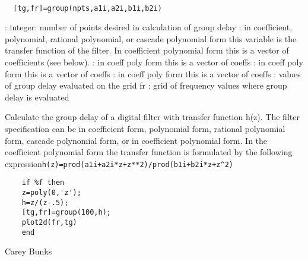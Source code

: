 \begin{mandesc}
   \\ %
\end{mandesc}
\begin{calling_sequence}
\begin{verbatim}
  [tg,fr]=group(npts,a1i,a2i,b1i,b2i)  
\end{verbatim}
\end{calling_sequence}
\begin{parameters}
  \begin{varlist}
    : integer: number of points desired in calculation of group delay
    : in coefficient, polynomial, rational polynomial, or cascade polynomial form this variable is the transfer function of the filter. In coefficient polynomial form this is a vector of coefficients (see below).
    : in coeff poly form this is a vector of coeffs
    : in coeff poly form this is a vector of coeffs
    : in coeff poly form this is a vector of coeffs
    : values of group delay evaluated on the grid fr
    : grid of frequency values where group delay is evaluated
  \end{varlist}
\end{parameters}
\begin{mandescription}
  Calculate the group delay of a digital filter
  with transfer function h(z).
  The filter specification can be in coefficient form,
  polynomial form, rational polynomial form, cascade
  polynomial form, or in coefficient polynomial form.
  In the coefficient polynomial form the transfer function is
  formulated by the following expression\verb!h(z)=prod(a1i+a2i*z+z**2)/prod(b1i+b2i*z+z^2)!
\end{mandescription}
\begin{examples}
  \begin{Verbatim}
    if %f then
    z=poly(0,'z');
    h=z/(z-.5);
    [tg,fr]=group(100,h);
    plot2d(fr,tg)
    end
  \end{Verbatim}
\end{examples}
\begin{authors}
    Carey Bunks  
\end{authors}

